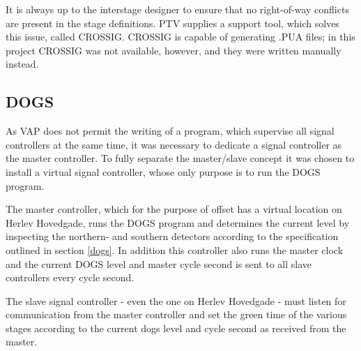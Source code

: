 It is always up to the interstage designer to ensure that no right-of-way conflicts are present in the stage definitions. PTV supplies a support tool, which solves this issue, called CROSSIG. CROSSIG is capable of generating .PUA files; in this project CROSSIG was not available, however, and they were written manually instead.

\subsection{DOGS}
As VAP does not permit the writing of a program, which supervise all signal controllers at the same time, it was necessary to dedicate a signal controller as the master controller. To fully separate the master/slave concept it was chosen to install a virtual signal controller, whose only purpose is to run the DOGS program.

The master controller, which for the purpose of offset has a virtual location on Herlev Hovedgade, runs the DOGS program and determines the current level by inspecting the northern- and southern detectors according to the specification outlined in section \ref{dogs}. In addition this controller also runs the master clock and the current DOGS level and master cycle second is sent to all slave controllers every cycle second.

The slave signal controller - even the one on Herlev Hovedgade - must listen for communication from the master controller and set the green time of the various stages according to the current dogs level and cycle second as received from the master.